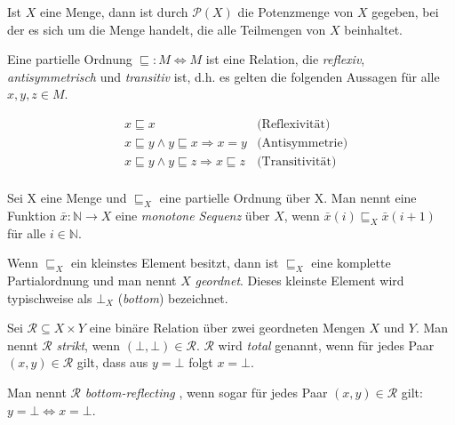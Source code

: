 
Ist $X$ eine Menge, dann ist durch $\mathcal{P}(X)$ die Potenzmenge von $X$ gegeben, bei der es sich um die Menge handelt, die alle Teilmengen von $X$ beinhaltet.


Eine partielle Ordnung $\sqsubseteq : M \Leftrightarrow M$ ist eine Relation, die \textit{reflexiv}, \textit{antisymmetrisch} und \textit{transitiv} ist, d.h. es gelten die folgenden Aussagen für alle $x, y, z \in M$.

\begin{align*}
& x \sqsubseteq x & \text{(Reflexivität)} \\
& x \sqsubseteq y \land y \sqsubseteq x \Rightarrow x = y & \text{(Antisymmetrie)} \\
& x \sqsubseteq y \land y \sqsubseteq z \Rightarrow x \sqsubseteq z & \text{(Transitivität)} \\
\end{align*}

Sei X eine Menge und $\sqsubseteq_{X}$ eine partielle Ordnung über X. Man nennt eine Funktion $\bar{x} : \mathbb{N} \rightarrow X$
eine \textit{monotone Sequenz} über $X$, wenn $\bar{x}(i) \sqsubseteq_{X} \bar{x}(i + 1)$ für alle $i \in \mathbb{N}$.

Wenn $\sqsubseteq_{X}$ ein kleinstes Element besitzt, dann ist $\sqsubseteq_{X}$ eine komplette Partialordnung und man nennt $X$
\textit{geordnet}. Dieses kleinste Element wird typischweise als $\bot_{X}$ (\textit{bottom}) bezeichnet.

Sei $\mathcal{R} \subseteq X \times Y$ eine binäre Relation über zwei geordneten Mengen $X$ und $Y$. Man nennt $\mathcal{R}$ \textit{strikt},
wenn $(\bot, \bot) \in \mathcal{R}$. $\mathcal{R}$ wird \textit{total} genannt, wenn für jedes Paar $(x, y) \in \mathcal{R}$ gilt, dass
aus $y = \bot$ folgt $x = \bot$.

Man nennt $\mathcal{R}$ \textit{bottom-reflecting} , wenn sogar für jedes Paar
$(x, y) \in \mathcal{R}$ gilt: $y = \bot \Leftrightarrow x = \bot$.

